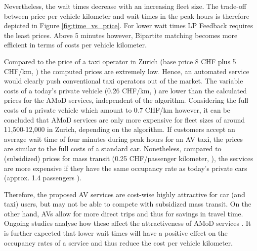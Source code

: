 Nevertheless, the wait times decrease with an increasing fleet size. The trade-off
between price per vehicle kilometer and wait times in the peak hours is therefore depicted in
Figure \ref{fig:time_vs_price}. For lower wait times LP Feedback requires the
least prices. Above 5 minutes however, Bipartite matching becomes more efficient
in terms of costs per vehicle kilometer.


Compared to the price of a taxi operator in Zurich (base price 8 CHF plus 5 CHF/km, \cite{StadtZurich2014})
the computed prices are extremely low. Hence, an automated service would clearly
push conventional taxi operators out of the market. The variable costs of a today's
private vehicle (0.26 CHF/km, \cite{TCS2016}) are lower than the calculated prices for the AMoD services,
independent of the algorithm. Considering the full costs of a private vehicle which amount to 0.7 CHF/km \cite{TCS2016} however, it can be concluded that AMoD services are only more expensive for fleet sizes of around 11,500-12,000
in Zurich, depending on the algorithm. If customers accept an average wait time of four minutes 
during peak hours for an AV taxi, the prices are similar to the full costs of a standard car.
Nonetheless, compared to (subsidized) prices for mass transit (0.25 CHF/passenger kilometer, \cite{Bosch2016a}), the services are more expensive if they have the same occupancy rate as today's private cars (approx. 1.4 passengers \cite{Bosch2016a}).

Therefore, the proposed AV services are cost-wise highly attractive for car (and taxi) users, but may
not be able to compete with subsidized mass transit. On the other hand, AVs
allow for more direct trips and thus for savings in travel time. Ongoing studies analyse
how these affect the attractiveness of AMoD services \cite{ Becker2017}. It is further expected
that lower wait times will have a positive effect on the occupancy rates of a service
and thus reduce the cost per vehicle kilometer.


